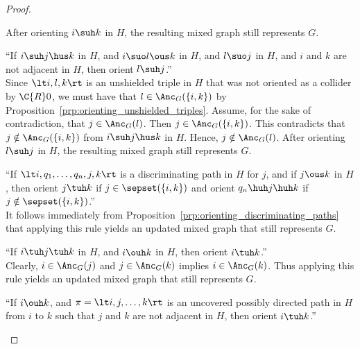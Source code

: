 \begin{proof}
\begin{description}
      After orienting $i \suh k$ in $H$, the resulting mixed graph still represents $G$.
    \item[$\C{R}3$] ``If $i \suh j \hus k$ in $H$, and $i \suo l \ous k$ in $H$, and $l \suo j$ in $H$, and $i$ and $k$ are not adjacent in $H$, then orient $l \suh j$.''\\
      Since $\lt i, l, k \rt$ is an unshielded triple in $H$ that was not oriented as a collider by $\C{R}0$, we must have that $l \in \Anc_G(\{i,k\})$ by Proposition~\ref{prp:orienting_unshielded_triples}.
      Assume, for the sake of contradiction, that $j \in \Anc_G(l)$. 
      Then $j \in \Anc_G(\{i,k\})$.
      This contradicts that $j \notin \Anc_G(\{i,k\})$ from $i \suh j \hus k$ in $H$.
      Hence, $j \notin \Anc_G(l)$.
      After orienting $l \suh j$ in $H$, the resulting mixed graph still represents $G$.
    \item[$\C{R}4$] ``If $\lt i, q_1, \dots, q_n, j, k \rt$ is a discriminating path in $H$ for $j$, and if $j \ous k$ in $H$, then orient $j \tuh k$ if $j \in \sepset(\{i,k\})$ and orient $q_n \huh j \huh k$ if $j \notin \sepset(\{i,k\})$.''\\ %
      It follows immediately from Proposition~\ref{prp:orienting_discriminating_paths} that applying this rule yields an updated mixed graph that still represents $G$.
    \item[$\C{R}8$] ``If $i \tuh j \tuh k$ in $H$, and $i \ouh k$ in $H$, then orient $i \tuh k$.''\\
      Clearly, $i \in \Anc_G(j)$ and $j \in \Anc_G(k)$ implies $i \in \Anc_G(k)$.
      Thus applying this rule yields an updated mixed graph that still represents $G$.
    \item[$\C{R}9$] ``If $i \ouh k$, and $\pi = \lt i, j, \dots, k \rt$ is an uncovered possibly directed path in $H$ from $i$ to $k$ such that $j$ and $k$ are not adjacent in $H$, then orient $i \tuh k$.''\\

\end{description}
\end{proof}
